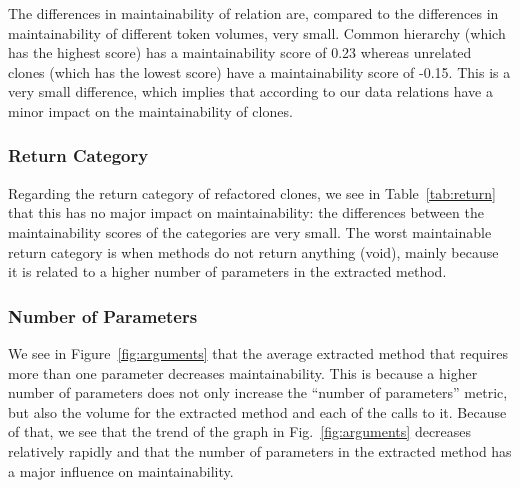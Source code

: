 The differences in maintainability of relation are, compared to the differences in maintainability of different token volumes, very small. Common hierarchy (which has the highest score) has a maintainability score of 0.23 whereas unrelated clones (which has the lowest score) have a maintainability score of -0.15. This is a very small difference, which implies that according to our data relations have a minor impact on the maintainability of clones.

\subsubsection{Return Category}
Regarding the return category of refactored clones, we see in Table~\ref{tab:return} that this has no major impact on maintainability: the differences between the maintainability scores of the categories are very small. The worst maintainable return category is when methods do not return anything (void), mainly because it is related to a higher number of parameters in the extracted method.

\subsubsection{Number of Parameters}
We see in Figure~\ref{fig:arguments} that the average extracted method that requires more than one parameter decreases maintainability. This is because a higher number of parameters does not only increase the ``number of parameters'' metric, but also the volume for the extracted method and each of the calls to it. Because of that, we see that the trend of the graph in Fig.~\ref{fig:arguments} decreases relatively rapidly and that the number of parameters in the extracted method has a major influence on maintainability.
